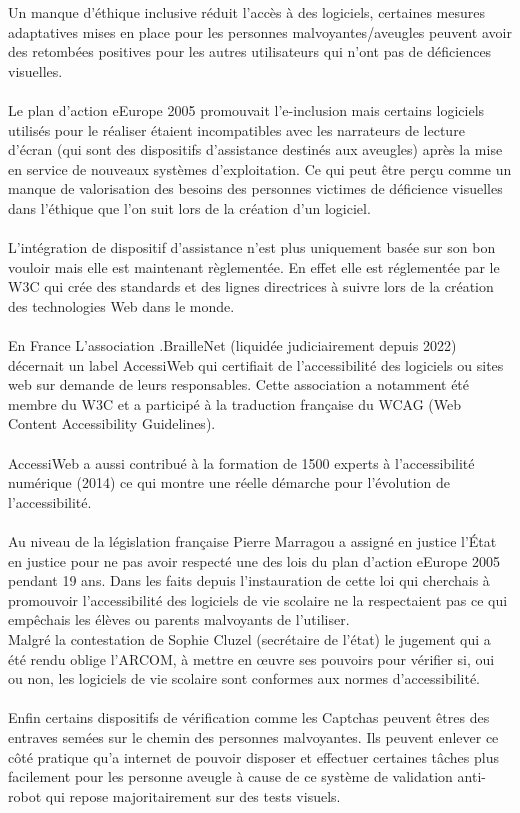 \documentclass{article}
\begin{document}
Un manque d’éthique inclusive réduit l’accès à des logiciels, certaines mesures adaptatives mises en place pour les personnes malvoyantes/aveugles peuvent avoir des retombées positives pour les autres utilisateurs qui n’ont pas de déficiences visuelles. \\ \\
Le plan d’action eEurope 2005 promouvait l’e-inclusion mais certains logiciels utilisés pour le réaliser étaient incompatibles avec les narrateurs de lecture d'écran (qui sont des dispositifs d’assistance destinés aux aveugles) après la mise en service de nouveaux systèmes d'exploitation. Ce qui peut être perçu comme un manque de valorisation des besoins des personnes victimes de déficience visuelles dans l’éthique que l’on suit lors de la création d’un logiciel. 
\\\\
L’intégration de dispositif d’assistance n’est plus uniquement basée sur son bon vouloir mais elle est maintenant règlementée. En effet elle est réglementée par le W3C qui crée des standards et des lignes directrices à suivre lors de la création des technologies Web dans le monde. 
\\\\
En France L’association \cite{Wikipedia}.BrailleNet (liquidée judiciairement depuis 2022) décernait un label AccessiWeb qui certifiait de l’accessibilité des logiciels ou sites web sur demande de leurs responsables. Cette association a notamment été membre du W3C et a participé à la traduction française du WCAG (Web Content Accessibility Guidelines). 
\\\\
AccessiWeb a aussi contribué à la formation de 1500 experts à l’accessibilité numérique (2014) ce qui montre une réelle démarche pour l’évolution de l’accessibilité. 
\\\\
\cite{Gourvennec_2024}Au niveau de la législation française Pierre Marragou a assigné en justice l’État en justice pour ne pas avoir respecté une des lois du plan d’action eEurope 2005 pendant 19 ans. Dans les faits depuis l’instauration de cette loi qui cherchais à promouvoir l’accessibilité des logiciels de vie scolaire ne la respectaient pas ce qui empêchais les élèves ou parents malvoyants de l’utiliser. \\ Malgré la contestation de Sophie Cluzel (secrétaire de l’état) le jugement qui a été rendu oblige l’ARCOM, à mettre en œuvre ses pouvoirs pour vérifier si, oui ou non, les logiciels de vie scolaire sont conformes aux normes d’accessibilité. \\\\ 
Enfin certains dispositifs de vérification comme les Captchas \cite{Wagner_2022b} peuvent êtres des entraves semées sur le chemin des personnes malvoyantes. Ils peuvent enlever ce côté pratique qu’a internet de pouvoir disposer et effectuer certaines tâches plus facilement pour les personne aveugle à cause de ce système de validation anti-robot qui repose majoritairement sur des tests visuels. \\\\
\end{document}
